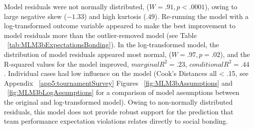 Model residuals were not normally distributed, ($W = .91, p < .0001$), owing to large negative skew ($-1.33$) and high kurtosis ($.49$). Re-running the model with a log-transformed outcome variable appeared to make the best improvement to model residuals more than the outlier-removed model (see Table ~\ref{tab:MLM3bExpectationsBonding}). In the log-transformed model, the distribution of model residuals appeared most normal,  ($W = .97, p = .02$), and the R-squared values for the model improved, $marginal R^2 = .23$, $conditional R^2 = .44$.  Individual cases had low influence on the model (Cook's Distances all < .15, see Appendix ~\ref{app5:tournamentSurvey} Figures ~\ref{fig:MLM3bAssumptions} and ~\ref{fig:MLM3bLogAssumptions} for a comparison of model assumptions between the original and log-transformed model). Owing to non-normally distributed residuals, this model does not provide robust support for the prediction that team performance expectation violations relates directly to social bonding.


\restoregeometry










